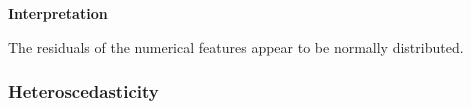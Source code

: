 \documentclass[9pt]{article}
\begin{document}
    \begin{center}
    \end{center}
    { \hspace*{\fill} \\}
    
    \begin{center}
    \end{center}
    { \hspace*{\fill} \\}
    
    \textbf{Interpretation}

The residuals of the numerical features appear to be normally
distributed.

    \hypertarget{heteroscedasticity}{%
\subsubsection{Heteroscedasticity}\label{heteroscedasticity}}
\end{document}
